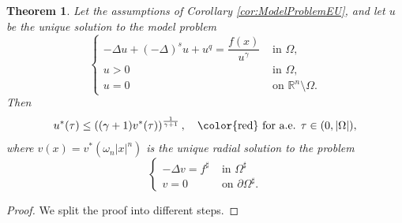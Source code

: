 \documentclass[11pt,a4paper]{amsart}
\theoremstyle{definition}
\theoremstyle{plain}
\newtheorem{theorem}[definition]{Theorem}
\numberwithin{equation}{section}
\begin{document}
{\begin{theorem}\label{thm:pointwise_talenti}
Let the assumptions of Corollary \ref{cor:ModelProblemEU}, and let $u$ be the unique solu\-tion to the model problem 
\begin{equation}\label{eq:Model-talenti}
\left\{ \begin{array}{rl}
-\Delta u + (-\Delta)^s u + u^q = \dfrac{f(x)}{u^{\gamma}} & \text{ in } \Omega,\\
u>0 & \text{ in } \Omega,\\
u=0 & \text{ on } \mathbb{R}^{n}\setminus \Omega.
\end{array}\right.
\end{equation}
Then
\begin{equation}\label{th:talenti2}
u^\ast(\tau) \leq\left((\gamma+1)v^\ast(\tau)\right)^{\frac{1}{\gamma+1}}, \quad \text{{\color{red}} for a.e. }\tau \in(0,|\Omega|),
\end{equation}
where $v(x)=v^\ast\left(\omega_n|x|^n\right)$ is the unique radial
solution to the problem
\begin{equation}\label{eq:comp-talenti}
\begin{cases}-\Delta v=f^{\sharp} & \text { in } \Omega^{\sharp} \\ v=0 & \text { on } \partial\Omega^{\sharp} .\end{cases}
\end{equation}
\end{theorem}
\begin{proof}
We split the proof into different steps. 
  \vspace{0.2cm}


\end{proof}}
\end{document}
